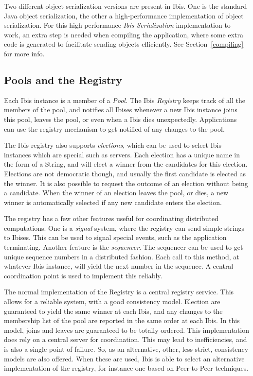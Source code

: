 \documentclass[10pt]{article}
\begin{document}
Two different object serialization versions are present in Ibis.  One is
the standard Java object serialization, the other a high-performance
implementation of object serialization. For this high-performance
\emph{Ibis Serialization} implementation to work, an extra step is needed
when compiling the application, where some extra code is generated to
facilitate sending objects efficiently. See Section~\ref{compiling} for
more info.

\subsection{Pools and the Registry}


Each Ibis instance is a member of a \emph{Pool}. The Ibis
\emph{Registry} keeps track of all the members of the pool, and notifies
all Ibises whenever a new Ibis instance joins this pool, leaves the
pool, or even when a Ibis dies unexpectedly. Applications can use the
registry mechanism to get notified of any changes to the pool.

The Ibis registry also supports \emph{elections}, which can be used to
select Ibis instances which are special such as servers.  Each election
has a unique name in the form of a String, and will elect a winner from
the candidates for this election. Elections are not democratic though,
and usually the first candidate is elected as the winner. It is also
possible to request the outcome of an election without being a
candidate. When the winner of an election leaves the pool, or dies, a
new winner is automatically selected if any new candidate enters the
election.

The registry has a few other features useful for coordinating
distributed computations. One is a \emph{signal} system, where the
registry can send simple strings to Ibises. This can be used to signal
special events, such as the application terminating. Another feature is
the \emph{sequencer}. The sequencer can be used to get unique sequence
numbers in a distributed fashion. Each call to this method, at
whatever Ibis instance, will yield the next number in the sequence. A
central coordination point is used to implement this reliably.

The normal implementation of the Registry is a central registry service.
This allows for a reliable system, with a good consistency model.
Election are guaranteed to yield the same winner at each Ibis, and any
changes to the membership list of the pool are reported in the same
order at each Ibis. In this model, joins and leaves are guaranteed to be
totally ordered. This implementation does rely on a central server
for coordination. This may lead to inefficiencies, and is also a single
point of failure. So, as an alternative, other, less strict, consistency
models are also offered. When these are used, Ibis is able to select an
alternative implementation of the registry, for instance one based on
Peer-to-Peer techniques.
\end{document}
